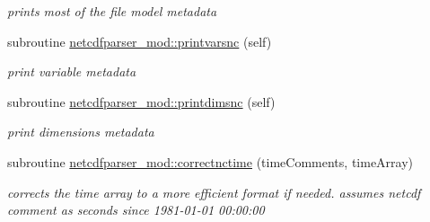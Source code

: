 \begin{DoxyCompactItemize}
\begin{DoxyCompactList}\small\item\em prints most of the file model metadata \end{DoxyCompactList}\item 
subroutine \mbox{\hyperlink{namespacenetcdfparser__mod_a6b57fa47d7bd796c75483216a51e5e04}{netcdfparser\+\_\+mod\+::printvarsnc}} (self)
\begin{DoxyCompactList}\small\item\em print variable metadata \end{DoxyCompactList}\item 
subroutine \mbox{\hyperlink{namespacenetcdfparser__mod_ac01c000a97d23613684155708249ce89}{netcdfparser\+\_\+mod\+::printdimsnc}} (self)
\begin{DoxyCompactList}\small\item\em print dimensions metadata \end{DoxyCompactList}\item 
subroutine \mbox{\hyperlink{namespacenetcdfparser__mod_af93319fde6cf6baedb7fe27bf3396e7b}{netcdfparser\+\_\+mod\+::correctnctime}} (time\+Comments, time\+Array)
\begin{DoxyCompactList}\small\item\em corrects the time array to a more efficient format if needed. assumes netcdf comment as \textquotesingle{}seconds since 1981-\/01-\/01 00\+:00\+:00\textquotesingle{} \end{DoxyCompactList}\end{DoxyCompactItemize}
